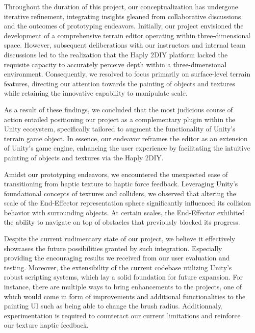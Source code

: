 Throughout the duration of this project, our conceptualization has undergone iterative refinement, integrating insights gleaned from collaborative discussions and the outcomes of prototyping endeavors. 
Initially, our project envisioned the development of a comprehensive terrain editor operating within three-dimensional space. 
However, subsequent deliberations with our instructors and internal team discussions led to the realization that the Haply 2DIY platform lacked the requisite capacity to accurately perceive depth within a three-dimensional environment. 
Consequently, we resolved to focus primarily on surface-level terrain features, directing our attention towards the painting of objects and textures while retaining the innovative capability to manipulate scale.

As a result of these findings, we concluded that the most judicious course of action entailed positioning our project as a complementary plugin within the Unity ecosystem, specifically tailored to augment the functionality of Unity's terrain game object. 
In essence, our endeavor reframes the editor as an extension of Unity's game engine, enhancing the user experience by facilitating the intuitive painting of objects and textures via the Haply 2DIY.

Amidst our prototyping endeavors, we encountered the unexpected ease of transitioning from haptic texture to haptic force feedback. 
Leveraging Unity's foundational concepts of textures and colliders, we observed that altering the scale of the End-Effector representation sphere significantly influenced its collision behavior with surrounding objects. 
At certain scales, the End-Effector exhibited the ability to navigate on top of obstacles that previously blocked its progress.

Despite the current rudimentary state of our project, we believe it effectively showcases the future possibilities granted by such integration.
Especially providing the encouraging results we received from our user evaluation and testing.
Moreover, the extensibility of the current codebase utilizing Unity's robust scripting systems, which lay a solid foundation for future expansion. 
For instance, there are multiple ways to bring enhancements to the projects, one of which would come in form of improvements and additional functionalities to the painting UI such as being able to change the brush radius.
Additionnaly, experimentation is required to counteract our current limitations and reinforce our texture haptic feedback.